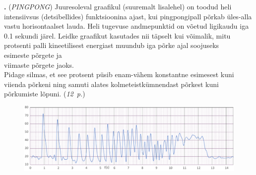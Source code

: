 \documentclass[11pt,a5paper]{article}
\newcommand{\numb}[1]{\vspace{5pt}\textbf{\large #1}}
\newcommand{\nimi}[1]{(\textsl{\small #1})}
\newcommand{\punktid}[1]{(\emph{#1~p.})}
\newcounter{ylesanne}
\newcommand{\yl}[1]{\addtocounter{ylesanne}{1}\numb{\theylesanne.} \nimi{#1} \newblock{}}
\newcommand{\autor}[1]{}%
\begin{document}
\newpage
\yl{PINGPONG}
Juuresoleval graafikul (suuremalt lisalehel) on toodud heli intensiivsus (detsibellides) funktsioonina ajast, kui pingpongipall põrkab üles-alla vastu horisontaalset lauda. Heli tugevuse andmepunktid on võetud ligikaudu iga \num{0.1} sekundi järel. Leidke graafikut kasutades nii täpselt kui võimalik, mitu protsenti palli kineetilisest energiast muundub iga põrke ajal soojuseks\\
\osa esimeste põrgete ja \\
\osa viimaste põrgete jaoks.\\
Pidage silmas, et see protsent püsib enam-vähem konstantne esimesest kuni viienda põrkeni ning samuti alates kolmeteistkümnendast põrkest kuni põrkumiste lõpuni.
\punktid{12} \autor{Jaan Kalda}
\begin{figure}[!h]
  \centering
  \includegraphics[width=\textwidth]{pingpong}
\end{figure}
\end{document}
